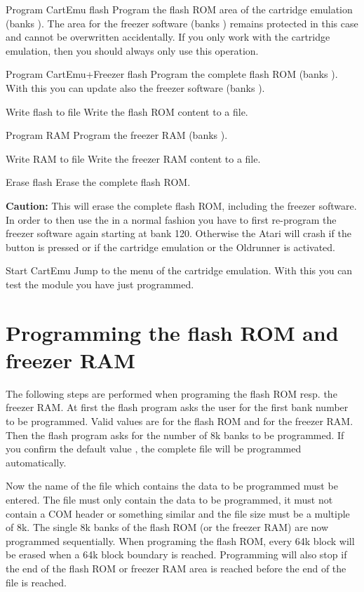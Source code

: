 \begin{fcmdlist}
\item[Program CartEmu flash] Program the flash ROM area of the cartridge
emulation (banks ). The area for the freezer software (banks
) remains protected in this case and cannot be overwritten
accidentally. If you only work with the cartridge emulation, then you should
always only use this operation.
\item[Program CartEmu+Freezer flash] Program the complete flash ROM (banks
). With this you can update also the freezer software (banks
).
\item[Write flash to file] Write the flash ROM content to a file.
\item[Program RAM] Program the freezer RAM (banks ).
\item[Write RAM to file] Write the freezer RAM content to a file.

\clearpage
\item[Erase flash] Erase the complete flash ROM.\newline

\textbf{Caution:} This will erase the complete flash ROM, including the freezer
software. In order to then use the \frz in a normal fashion you have to first
re-program the freezer software again starting at bank 120. Otherwise the Atari
will crash if the  button is pressed or if the cartridge emulation
or the Oldrunner is activated.
\item[Start CartEmu] Jump to the menu of the cartridge emulation. With this you
can test the module you have just programmed.
\end{fcmdlist}

\section{Programming the flash ROM and freezer RAM}
The following steps are performed when programing the flash ROM resp. the
freezer RAM. At first the flash program asks the user for the first bank number
to be programmed. Valid values are  for the flash ROM and
 for the freezer RAM. Then the flash program asks for the number
of 8k banks to be programmed. If you confirm the default value , the
complete file will be programmed automatically. 

Now the name of the file which contains the data to be programmed must be
entered. The file must only contain the data to be programmed, \ie it must not
contain a COM header or something similar and the file size must be a multiple
of 8k. The single 8k banks of the flash ROM (or the freezer RAM) are
now programmed sequentially. When programing the flash ROM, every 64k block will
be erased when a 64k block boundary is reached. Programming will also stop if
the end of the flash ROM or freezer RAM area is reached before the end of the
file is reached.

